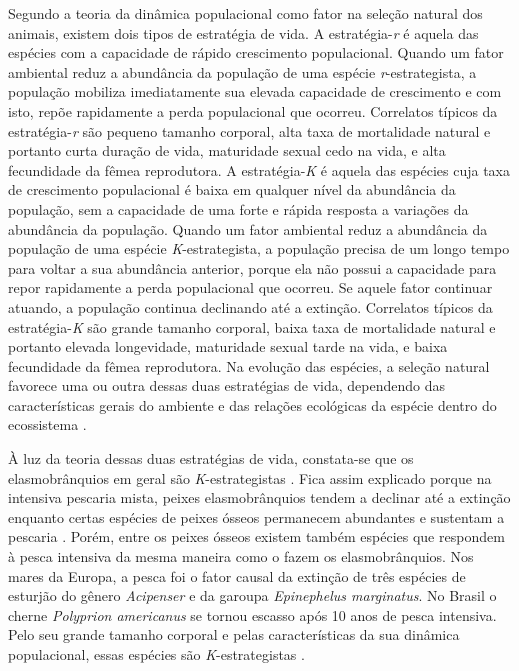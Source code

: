 \documentclass[a4paper,11pt,twoside,showtrims,onecolumn,openright,final]{memoir}
\begin{document}
Segundo a teoria da dinâmica populacional como fator na seleção natural dos animais, 
existem dois tipos de estratégia de vida. A estratégia-\emph{r} é aquela das espécies com 
a capacidade de rápido crescimento populacional. Quando um fator ambiental reduz  a abundância 
da população de uma espécie \emph{r}-estrategista, a população mobiliza imediatamente sua elevada 
capacidade de crescimento e com isto, repõe rapidamente a perda populacional que ocorreu. 
Correlatos típicos da estratégia-\emph{r} são pequeno tamanho corporal, alta taxa de mortalidade natural 
e portanto curta duração de vida, maturidade sexual cedo na vida, e alta fecundidade da fêmea reprodutora. 
A estratégia-\emph{K} é aquela das espécies cuja taxa de crescimento populacional é baixa em qualquer 
nível da abundância da população, sem a capacidade de uma forte e rápida resposta a variações da abundância 
da população. Quando um fator ambiental reduz  a abundância da população de uma espécie \emph{K}-estrategista, 
a população precisa de um longo tempo para voltar a sua abundância anterior, porque ela não possui a 
capacidade para repor rapidamente a perda populacional que ocorreu. Se aquele fator continuar atuando, 
a população continua declinando até a extinção. Correlatos típicos da estratégia-\emph{K} são grande 
tamanho corporal, baixa taxa de mortalidade natural e portanto elevada longevidade, maturidade sexual 
tarde na vida, e baixa fecundidade da fêmea reprodutora. Na evolução das espécies, a seleção natural 
favorece uma ou outra dessas duas estratégias de vida, dependendo das características gerais do ambiente 
e das relações ecológicas da espécie dentro do ecossistema \citep{murray1979}. %

À luz da teoria dessas duas estratégias de vida, constata-se que os elasmobrânquios em geral 
são \emph{K}-estrategistas \citep{hoenig1990}. %
Fica assim explicado porque  na intensiva pescaria mista, peixes elasmobrânquios tendem a declinar 
até a extinção enquanto certas espécies de  peixes ósseos permanecem abundantes 
e sustentam a pescaria \citep{camhi1998,musick2000a}. %
Porém, entre os peixes ósseos existem também espécies que respondem à pesca intensiva da mesma 
maneira como o fazem os elasmobrânquios. Nos mares da Europa, a pesca foi o fator causal 
da extinção de três espécies de esturjão do gênero \emph{Acipenser} e da garoupa  \emph{Epinephelus marginatus}. 
No Brasil o cherne  \emph{Polyprion americanus} se tornou escasso após 10 anos de pesca intensiva. 
Pelo seu grande tamanho corporal e pelas características da sua dinâmica populacional, essas espécies 
são \emph{K}-estrategistas \citep{dulvy2003,peres2003}. %
\end{document}
